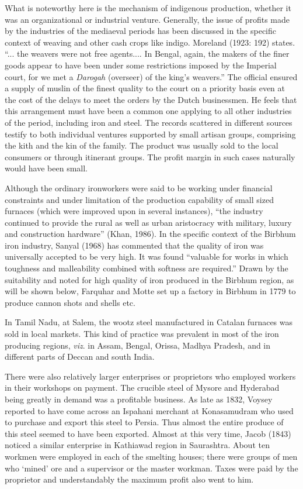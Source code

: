 What is noteworthy here is the mechanism of indigenous production, whether it was an organizational or industrial venture. Generally, the issue of profits made by the industries of the mediaeval periods has been discussed in the specific context of weaving and other cash crops like indigo. Moreland (1923: 192) states. ``... the weavers were not free agents.... In Bengal, again, the makers of the finer goods appear to have been under some restrictions imposed by the Imperial court, for we met a \textit{Darogah} (overseer) of the king's weavers.'' The official ensured a supply of muslin of the finest quality to the court on a priority basis even at the cost of the delays to meet the orders by the Dutch businessmen. He feels that this arrangement must have been a common one applying to all other industries of the period, including iron and steel. The records scattered in different sources testify to both individual ventures supported by small artisan groups, comprising the kith and the kin of the family. The product was usually sold to the local consumers or through itinerant groups. The profit margin in such cases naturally would have been small.

Although the ordinary ironworkers were said to be working under financial constraints and under limitation of the production capability of small sized furnaces (which were improved upon in several instances), ``the industry continued to provide the rural as well as urban aristocracy with military, luxury and construction hardware'' (Khan, 1986). In the specific context of the Birbhum iron industry, Sanyal (1968) has commented that the quality of iron was universally accepted to be very high. It was found ``valuable for works in which toughness and malleability combined with softness are required.'' Drawn by the suitability and noted for high quality of iron produced in the Birbhum region, as will be shown below, Farquhar and Motte set up a factory in Birbhum in 1779 to produce cannon shots and shells etc.

In Tamil Nadu, at Salem, the wootz steel manufactured in Catalan furnaces was sold in local markets. This kind of practice was prevalent in most of the iron producing regions, \textit{viz}. in Assam, Bengal, Orissa, Madhya Pradesh, and in different parts of Deccan and south India.

There were also relatively larger enterprises or proprietors who employed workers in their workshops on payment. The crucible steel of Mysore and Hyderabad being greatly in demand was a profitable business. As late as 1832, Voysey reported to have come across an Ispahani merchant at Konasamudram who used to purchase and export this steel to Persia. Thus almost the entire produce of this steel seemed to have been exported. Almost at this very time, Jacob (1843) noticed a similar enterprise in Kathiawad region in Saurashtra. About ten workmen were employed in each of the smelting houses; there were groups of men who `mined' ore and a supervisor or the master workman. Taxes were paid by the proprietor and understandably the maximum profit also went to him.

